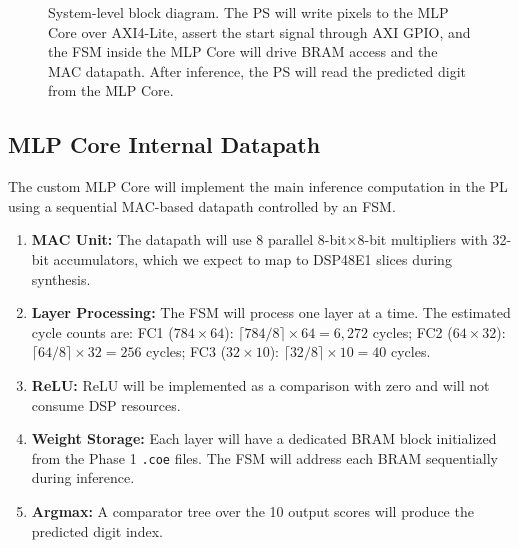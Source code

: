 \documentclass[12pt, letterpaper]{article}
\begin{document}
\begin{figure}[H]
{
}%
\caption{System-level block diagram. The PS will write pixels to the MLP Core over AXI4-Lite, assert
the start signal through AXI GPIO, and the FSM inside the MLP Core will drive BRAM access and the MAC
datapath. After inference, the PS will read the predicted digit from the MLP Core.}
\label{fig:arch}
\end{figure}


\subsection{MLP Core Internal Datapath}

The custom MLP Core will implement the main inference computation in the PL using a sequential MAC-based datapath controlled by an FSM.

\begin{enumerate}
    \item \textbf{MAC Unit:} The datapath will use 8 parallel 8-bit$\times$8-bit multipliers with 32-bit accumulators, which we expect to map to DSP48E1 slices during synthesis.

    \item \textbf{Layer Processing:} The FSM will process one layer at a time. The estimated cycle counts are: FC1 ($784\times64$): $\lceil784/8\rceil \times 64 = 6{,}272$ cycles; FC2 ($64\times32$): $\lceil64/8\rceil \times 32 = 256$ cycles; FC3 ($32\times10$): $\lceil32/8\rceil \times 10 = 40$ cycles.

    \item \textbf{ReLU:} ReLU will be implemented as a comparison with zero and will not consume DSP resources.

    \item \textbf{Weight Storage:} Each layer will have a dedicated BRAM block initialized from the Phase 1 \texttt{.coe} files. The FSM will address each BRAM sequentially during inference.

    \item \textbf{Argmax:} A comparator tree over the 10 output scores will produce the predicted digit index.
\end{enumerate}
\end{document}
